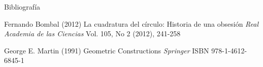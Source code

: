 \documentclass{beamer}
\begin{document}

\begin{frame}{Bibliografía}
\footnotesize{
\begin{thebibliography}{99} %
 Fernando Bombal (2012)
\newblock La cuadratura del círculo: Historia de una obsesión
\newblock \emph{Real Academia de las Ciencias} Vol. 105, No 2 (2012), 241-258
\end{thebibliography}

\begin{thebibliography}{99} %
 George E. Martin (1991)
\newblock Geometric Constructions
\newblock \emph{Springer} ISBN 978-1-4612-6845-1
\end{thebibliography}

}
\end{frame}















\end{document}
